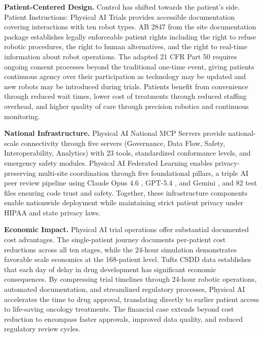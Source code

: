 \noindent\textbf{Patient-Centered Design.}
Control has shifted towards the patient's side. Patient Instructions: Physical
AI Trials \cite{patient-instructions-paper} provides accessible documentation
covering interactions with ten robot types. AB 2847 from the site documentation
package establishes legally enforceable patient rights including the right to
refuse robotic procedures, the right to human alternatives, and the right to
real-time information about robot operations. The adapted 21 CFR Part 50
\cite{cfr50-adapt} requires ongoing consent processes beyond the traditional
one-time event, giving patients continuous agency over their participation as
technology may be updated and new robots may be introduced during trials.
Patients benefit from convenience through reduced wait times, lower cost of
treatments through reduced staffing overhead, and higher quality of care through
precision robotics and continuous monitoring.

\vspace{0.3cm}

\noindent\textbf{National Infrastructure.}
Physical AI National MCP Servers \cite{national-mcp-paper} provide
national-scale connectivity through five servers (Governance, Data Flow, Safety,
Interoperability, Analytics) with 23 tools, standardized conformance levels, and
emergency safety modules. Physical AI Federated Learning \cite{fl-paper}
enables privacy-preserving multi-site coordination through five foundational
pillars, a triple AI peer review pipeline using Claude Opus 4.6
\cite{claude-opus}, GPT-5.4 \cite{gpt-5-4}, and Gemini \cite{gemini}, and 82
test files ensuring code trust and safety. Together, these infrastructure
components enable nationwide deployment while maintaining strict patient privacy
under HIPAA \cite{hipaa} and state privacy laws.

\vspace{0.3cm}

\noindent\textbf{Economic Impact.}
Physical AI trial operations offer substantial documented cost advantages. The
single-patient journey documents per-patient cost reductions across all ten
stages, while the 24-hour simulation demonstrates favorable scale economics at
the 168-patient level. Tufts CSDD data \cite{tufts-delay} establishes that each
day of delay in drug development has significant economic consequences. By
compressing trial timelines through 24-hour robotic operations, automated
documentation, and streamlined regulatory processes, Physical AI accelerates the
time to drug approval, translating directly to earlier patient access to
life-saving oncology treatments. The financial case extends beyond cost
reduction to encompass faster approvals, improved data quality, and reduced
regulatory review cycles.

